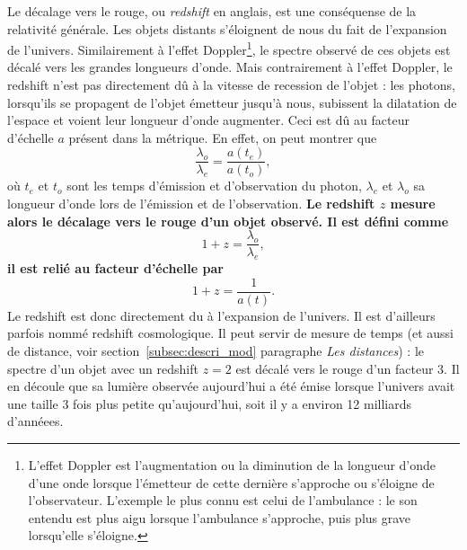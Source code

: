 \documentclass[11pt, twoside, a4paper, openright]{report}
\begin{document}
Le décalage vers le rouge, ou \emph{redshift} en anglais, est une conséquense de la relativité générale. Les objets distants s'éloignent de nous du fait de l'expansion de l'univers. Similairement à l'effet Doppler\footnote{L'effet Doppler est l'augmentation ou la diminution de la longueur d'onde d'une onde lorsque l'émetteur de cette dernière s'approche ou s'éloigne de l'observateur. L'exemple le plus connu est celui de l'ambulance : le son entendu est plus aigu lorsque l'ambulance s'approche, puis plus grave lorsqu'elle s'éloigne.}, le spectre observé de ces objets est décalé vers les grandes longueurs d'onde. Mais contrairement à l'effet Doppler, le redshift n'est pas directement dû à la vitesse de recession de l'objet : les photons, lorsqu'ils se propagent de l'objet émetteur jusqu'à nous, subissent la dilatation de l'espace et voient leur longueur d'onde augmenter. Ceci est dû au facteur d'échelle $a$ présent dans la métrique. En effet, on peut montrer que
\begin{equation}
  \frac{\lambda_o}{\lambda_e} = \frac{a(t_e)}{a(t_o)} ,
\end{equation}
où $t_e$ et $t_o$ sont les temps d'émission et d'observation du photon, $\lambda_{e}$  et $\lambda_{o}$ sa longueur d'onde lors de l'émission et de l'observation.
\textbf{Le redshift $z$ mesure alors le décalage vers le rouge d'un objet observé. Il est défini comme
\begin{equation}
  \label{eq:redshift}
  1 + z = \frac{\lambda_o}{\lambda_e} ,
\end{equation}
il est relié au facteur d'échelle par
\begin{equation}
  \label{eq:redshift2}
  1 + z = \frac{1}{a(t)}.
\end{equation} }
Le redshift est donc directement du à l'expansion de l'univers. Il est d'ailleurs parfois nommé redshift cosmologique. Il peut servir de mesure de temps (et aussi de distance, voir section~\ref{subsec:descri_mod} paragraphe \emph{Les distances}) : le spectre d'un objet avec un redshift $z=2$ est décalé vers le rouge d'un facteur 3. Il en découle que sa lumière observée aujourd'hui a été émise lorsque l'univers avait une taille 3 fois plus petite qu'aujourd'hui, soit il y a environ 12 milliards d'annéees.

\end{document}
